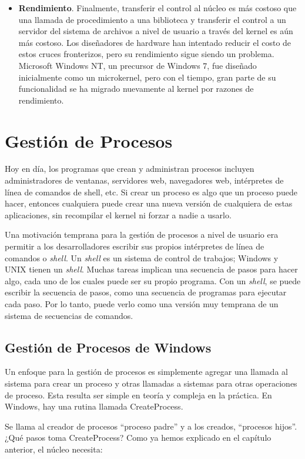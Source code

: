 \documentclass[10pt]{book}
\begin{document}
\begin{itemize}
\item \textbf{Rendimiento}. Finalmente, transferir el control al núcleo es más costoso que una llamada de procedimiento a una biblioteca y transferir el control a un servidor del sistema de archivos a nivel de usuario a través del kernel es aún más costoso. Los diseñadores de hardware han intentado reducir el costo de estos cruces fronterizos, pero su rendimiento sigue siendo un problema. Microsoft Windows NT, un precursor de Windows 7, fue diseñado inicialmente como un microkernel, pero con el tiempo, gran parte de su funcionalidad se ha migrado nuevamente al kernel por razones de rendimiento.
\end{itemize}

\section{Gestión de Procesos}
Hoy en día, los programas que crean y administran procesos incluyen administradores de ventanas, servidores web, navegadores web, intérpretes de línea de comandos de shell, etc. Si crear un proceso es algo que un proceso puede hacer, entonces cualquiera puede crear una nueva versión de cualquiera de estas aplicaciones, sin recompilar el kernel ni forzar a nadie a usarlo.

Una motivación temprana para la gestión de procesos a nivel de usuario era permitir a los desarrolladores escribir sus propios intérpretes de línea de comandos o \textit{shell}. Un \textit{shell} es un sistema de control de trabajos; Windows y UNIX tienen un \textit{shell}. Muchas tareas implican una secuencia de pasos para hacer algo, cada uno de los cuales puede ser su propio programa. Con un \textit{shell}, se puede escribir la secuencia de pasos, como una secuencia de programas para ejecutar cada paso. Por lo tanto, puede verlo como una versión muy temprana de un sistema de secuencias de comandos.

\subsection{Gestión de Procesos de Windows}
Un enfoque para la gestión de procesos es simplemente agregar una llamada al sistema para crear un proceso y otras llamadas a sistemas para otras operaciones de proceso. Esta resulta ser simple en teoría y compleja en la práctica. En Windows, hay una rutina llamada {\mf CreateProcess}.

Se llama al creador de procesos ``proceso padre'' y a los creados, ``procesos hijos''. ¿Qué pasos toma {\mf CreateProcess}? Como ya hemos explicado en el capítulo anterior, el núcleo necesita:
\end{document}
